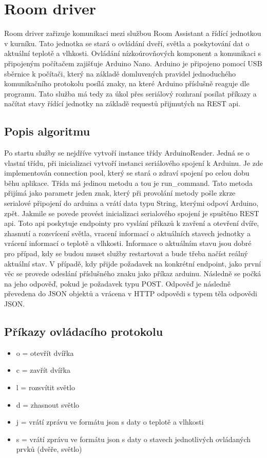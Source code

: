 \section{Room driver}\label{sec:room-driver}
Room driver zařizuje komunikaci mezi službou Room Assistant a řídící jednotkou v kurníku.
Tato jednotka se stará o ovládání dveří, světla a poskytování dat o aktuální teplotě a vlhkosti.
Ovládání nízkoúrovňových komponent a komunikaci s připojeným počítačem zajišťuje Arduino Nano.
Arduino je připojeno pomocí USB sběrnice k počítači, který na základě domluvených pravidel jednoduchého komunikačního protokolu posílá znaky, na které Arduino příslušně reaguje dle programu.
Tato služba má tedy za úkol přes seriálový rozhraní posílat příkazy a načítat stavy řídící jednotky na základě requestů přijmutých na REST api.

\subsection*{Popis algoritmu}
Po startu služby se nejdříve vytvoří instance třídy ArduinoReader.
Jedná se o vlastní třídu, při inicializaci vytvoří instanci seriálového spojení k Arduinu.
Je zde implementován connection pool, který se stará o zdraví spojení po celou dobu běhu aplikace.
Třída má jedinou metodu a tou je run\_command.
Tato metoda přijímá jako parametr jeden znak, který při provolání metody pošle zkrze serialové připojení do arduina a vrátí data typu String, kterými odpoví Arduino, zpět.
Jakmile se povede provést inicializaci serialového spojení je spuštěno REST api.
Toto api poskytuje endpointy pro vyslání příkazů k zavření a otevření dvíře, zhasnutí a rozsvícení světla, vracení informací o aktuálních stavech jednotky a vrácení informací o teplotě a vlhkosti.
Informace o aktuálním stavu jsou dobré pro případ, kdy se budou muset služby restartovat a bude třeba načíst reálný aktuální stav.
V případě, kdy přijde požadavek na konkrétní endpoint, jako první věc se provede odeslání příslušného znaku jako příkaz arduinu.
Následně se počká na jeho odpověď, pokud je požadavek typu POST.
Odpověď je následně převedena do JSON objektů a vrácena v HTTP odpovědi s typem těla odpovědi JSON.

\subsection*{Příkazy ovládacího protokolu}
\begin{itemize}
    \item o = otevřít dvířka
    \item c = zavřít dvířka
    \item l = rozsvítit světlo
    \item d = zhasnout světlo
    \item j = vrátí zprávu ve formátu json s daty o teplotě a vlhkosti
    \item s = vrátí zprávu ve formátu json s daty o stavech jednotlivých ovládaných prvků (dvěře, světlo)
\end{itemize}

